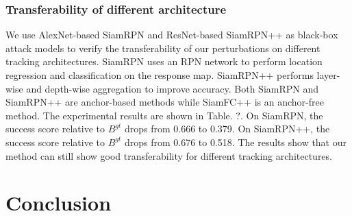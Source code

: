 \documentclass{article}
\begin{document}
\subsubsection{Transferability of different architecture}

We use AlexNet-based SiamRPN \cite{SiamRPN} and ResNet-based SiamRPN++ \cite{SiamRPN++} as black-box attack models to verify the transferability of our perturbations on different tracking architectures.
SiamRPN uses an RPN network to perform location regression and classification on the response map. SiamRPN++ performs layer-wise and depth-wise aggregation to improve accuracy. Both SiamRPN and SiamRPN++ are anchor-based methods while SiamFC++ is an anchor-free method.
The experimental results are shown in Table. ?. On SiamRPN, the success score relative to $B^{gt}$ drops from 0.666 to 0.379. On SiamRPN++, the success score relative to $B^{gt}$ drops from 0.676 to 0.518. The results show that our method can still show good transferability for different tracking architectures.


\begin{table}[ht]
\centering
{}
\caption{Transferability of different architecture on OTB2015}
\end{table}

\section{Conclusion}
\end{document}
